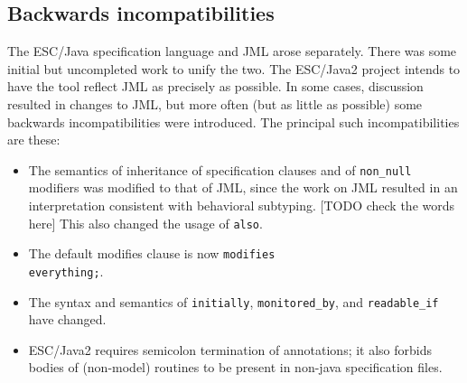 \documentclass{acm_proc_article-sp}
\begin{document}
\subsection{Backwards incompatibilities}
The ESC/Java specification language and JML arose separately.  There was some initial 
but uncompleted work to unify the two.
The ESC/Java2 project intends to have the tool
reflect JML as precisely as possible.  In some cases, discussion resulted in changes to
JML, but more often (but as little as possible) some backwards incompatibilities were
introduced.  The principal such incompatibilities are these:
\setlength{\partopsep}{0in}\setlength{\parskip}{0in}
\begin{itemize}\setlength{\itemsep}{0in}
\item The semantics of inheritance of specification clauses and of {\tt non\_null}
modifiers was modified to that of JML, since the work on JML resulted in an interpretation
consistent with behavioral subtyping. [TODO check the words here]  This also changed
the usage of {\tt also}.
\item The default modifies clause is now {\tt modifies \\everything;}.
\item The syntax and semantics of {\tt initially}, {\tt monitored\_by}, and {\tt readable\_if}
have changed.
\item ESC/Java2 requires semicolon termination of annotations; it also forbids bodies
of (non-model) routines to be present in non-java specification files.
\end{itemize}
\end{document}

